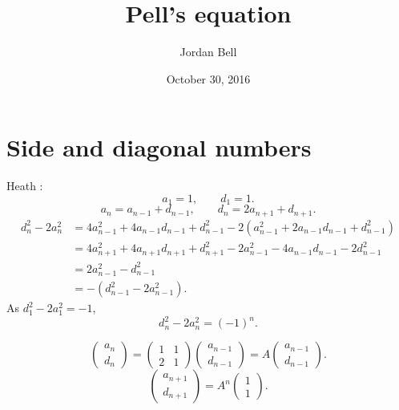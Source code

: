 \documentclass{article}
\theoremstyle{definition}
\theoremstyle{definition}
\begin{document}
\title{Pell's equation}
\author{Jordan Bell}
\date{October 30, 2016}
\maketitle


\section{Side and diagonal numbers}
Heath \cite[pp.~117--118]{diophantus}:
\[
a_1=1, \qquad d_1=1.
\]
\[
a_n=a_{n-1}+d_{n-1},\qquad d_n=2a_{n+1}+d_{n+1}.
\]
\begin{align*}
d_n^2-2a_n^2&=4a_{n-1}^2+4a_{n-1}d_{n-1}+d_{n-1}^2
-2(a_{n-1}^2+2a_{n-1}d_{n-1}+d_{n-1}^2)\\
&=4a_{n+1}^2+4a_{n+1}d_{n+1}+d_{n+1}^2-2a_{n-1}^2
-4a_{n-1}d_{n-1}-2d_{n-1}^2\\
&=2a_{n-1}^2-d_{n-1}^2\\
&=-(d_{n-1}^2-2a_{n-1}^2).
\end{align*}
As $d_1^2-2a_1^2=-1$,
\[
d_n^2-2a_n^2 = (-1)^n.
\]

\[
\begin{pmatrix}a_n\\d_n\end{pmatrix}
=\begin{pmatrix}1&1\\2&1\end{pmatrix}
\begin{pmatrix}
a_{n-1}\\
d_{n-1}
\end{pmatrix}
=A\begin{pmatrix}
a_{n-1}\\
d_{n-1}
\end{pmatrix}.
\]
\[
\begin{pmatrix}a_{n+1}\\d_{n+1}\end{pmatrix} = A^n \begin{pmatrix}1\\1\end{pmatrix}.
\]
\end{document}
